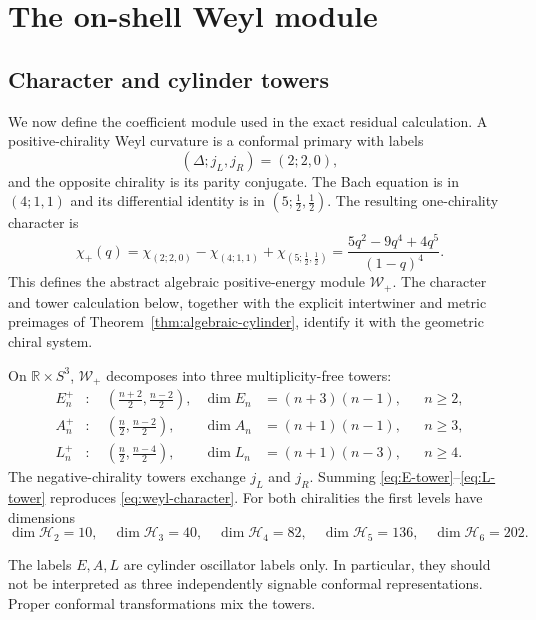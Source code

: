 \documentclass[11pt]{article}
\theoremstyle{definition}
\theoremstyle{remark}
\newcommand{\R}{\mathbb R}
\newcommand{\W}{\mathcal W}
\newcommand{\cH}{\mathcal H}
\begin{document}
\section{The on-shell Weyl module}\label{sec:weyl-module}

\subsection{Character and cylinder towers}

We now define the coefficient module used in the exact residual
calculation.  A positive-chirality Weyl curvature is a conformal primary
with labels
\begin{equation}
 (\Delta;j_L,j_R)=(2;2,0),
\end{equation}
and the opposite chirality is its parity conjugate.  The Bach equation is in
$(4;1,1)$ and its differential identity is in
$(5;\tfrac12,\tfrac12)$.  The resulting one-chirality character is
\begin{equation}\label{eq:weyl-character}
 \chi_+(q)
 =\chi_{(2;2,0)}-\chi_{(4;1,1)}
 +\chi_{(5;\frac12,\frac12)}
 =\frac{5q^2-9q^4+4q^5}{(1-q)^4}.
\end{equation}
This defines the abstract algebraic positive-energy module $\W_+$.  The
character and tower calculation below, together with the explicit
intertwiner and metric preimages of
Theorem~\ref{thm:algebraic-cylinder}, identify it with the geometric chiral
system.

On $\R\times S^3$, $\W_+$ decomposes into three multiplicity-free towers:
\begin{align}
 E_n^+&:\quad
 \left(\frac{n+2}{2},\frac{n-2}{2}\right),
 &\dim E_n&=(n+3)(n-1), &&n\ge2,\label{eq:E-tower}\\
 A_n^+&:\quad
 \left(\frac n2,\frac{n-2}{2}\right),
 &\dim A_n&=(n+1)(n-1), &&n\ge3,\label{eq:A-tower}\\
 L_n^+&:\quad
 \left(\frac n2,\frac{n-4}{2}\right),
 &\dim L_n&=(n+1)(n-3), &&n\ge4.\label{eq:L-tower}
\end{align}
The negative-chirality towers exchange $j_L$ and $j_R$.  Summing
\eqref{eq:E-tower}--\eqref{eq:L-tower} reproduces
\eqref{eq:weyl-character}.  For both chiralities the first levels have
dimensions
\begin{equation}
 \dim\cH_2=10,
 \quad \dim\cH_3=40,
 \quad \dim\cH_4=82,
 \quad \dim\cH_5=136,
 \quad \dim\cH_6=202.
\end{equation}

The labels $E,A,L$ are cylinder oscillator labels only.  In particular,
they should not be interpreted as three independently signable conformal
representations.  Proper conformal transformations mix the towers.
\end{document}
